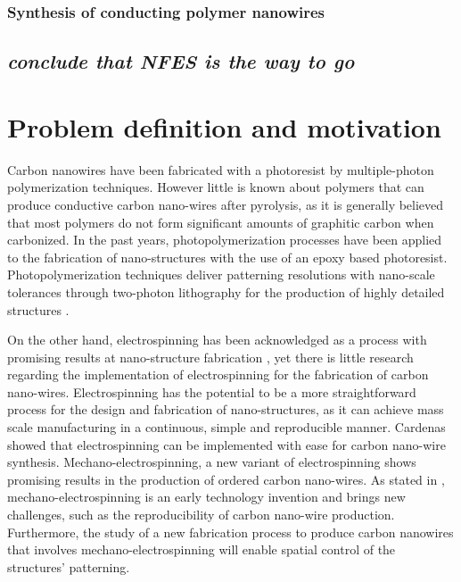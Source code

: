 \subsubsection{Synthesis of conducting polymer nanowires}



\subsection{\emph{conclude that NFES is the way to go}}




\section{Problem definition and motivation}


Carbon nanowires have been fabricated with a photoresist by multiple-photon polymerization techniques. However little is known about polymers that can produce conductive carbon nano-wires after pyrolysis, as it is generally believed that most polymers do not form significant amounts of graphitic carbon when carbonized.
In the past years, photopolymerization processes have been applied to the fabrication of nano-structures with the use of an epoxy based photoresist. \cite{Boer2014} Photopolymerization techniques deliver patterning resolutions with nano-scale tolerances through two-photon lithography for the production of highly detailed structures \cite{Hribar2014}.

On the other hand, electrospinning has been acknowledged as a process with promising results at nano-structure fabrication \cite{Boer2014}, yet there is little research regarding the implementation of electrospinning for the fabrication of carbon nano-wires. Electrospinning has the potential to be a more straightforward process for the design and fabrication of nano-structures, as it can achieve mass scale manufacturing in a continuous, simple and reproducible manner. Cardenas \cite{Cardenas2017} showed that electrospinning can be implemented with ease for carbon nano-wire synthesis. Mechano-electrospinning, a new variant of electrospinning shows promising results in the production of ordered carbon nano-wires. As stated in \cite{Cardenas2017}, mechano-electrospinning is an early technology invention and brings new challenges, such as the reproducibility of carbon nano-wire production. Furthermore, the study of a new fabrication process to produce carbon nanowires that involves mechano-electrospinning will enable spatial control of the structures' patterning.

